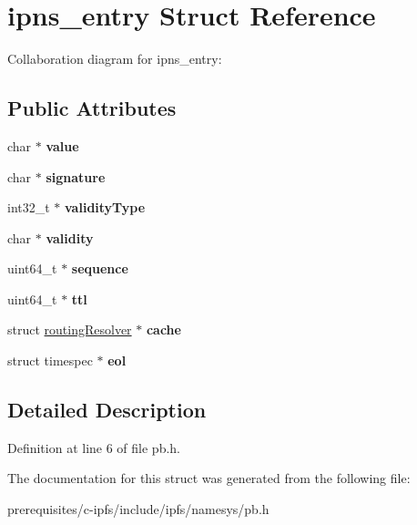 \hypertarget{structipns__entry}{}\section{ipns\+\_\+entry Struct Reference}
\label{structipns__entry}


Collaboration diagram for ipns\+\_\+entry\+:
\subsection*{Public Attributes}
\begin{DoxyCompactItemize}
\item 
\mbox{\label{structipns__entry_af2cd7dd5c7b909b866fe21e8b3803bfb}} 
char $\ast$ {\bfseries value}
\item 
\mbox{\label{structipns__entry_a81682daac2aa05a78ec80e888a3b27bb}} 
char $\ast$ {\bfseries signature}
\item 
\mbox{\label{structipns__entry_adc19f493793f9a71e558da13bed6aa02}} 
int32\+\_\+t $\ast$ {\bfseries validity\+Type}
\item 
\mbox{\label{structipns__entry_a11beee06d35e8a8a763084910294582d}} 
char $\ast$ {\bfseries validity}
\item 
\mbox{\label{structipns__entry_ab66a3ef21444bbe5aba44759ffb77de0}} 
uint64\+\_\+t $\ast$ {\bfseries sequence}
\item 
\mbox{\label{structipns__entry_af79b9249c58d256e306ba36b7567a69e}} 
uint64\+\_\+t $\ast$ {\bfseries ttl}
\item 
\mbox{\label{structipns__entry_a4c15e715e471432a35eee5313502a70f}} 
struct \mbox{\hyperlink{structrouting_resolver}{routing\+Resolver}} $\ast$ {\bfseries cache}
\item 
\mbox{\label{structipns__entry_a2c3ee4e85e87798f3e2e92ec82a69594}} 
struct timespec $\ast$ {\bfseries eol}
\end{DoxyCompactItemize}


\subsection{Detailed Description}


Definition at line 6 of file pb.\+h.



The documentation for this struct was generated from the following file\+:\begin{DoxyCompactItemize}
\item 
prerequisites/c-\/ipfs/include/ipfs/namesys/pb.\+h\end{DoxyCompactItemize}
